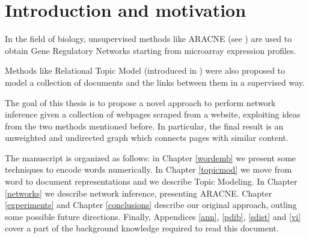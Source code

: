 \chapter{Introduction and motivation}

In the field of biology, unsupervised methods like ARACNE (see \cite{DBLP:journals/bmcbi/MargolinNBWSFC06}) 
are used to obtain Gene Regulatory Networks starting from microarray expression profiles. 

Methods like Relational Topic Model (introduced in \cite{pmlr-v5-chang09a}) were also proposed to 
model a collection of documents and the links between them in a supervised way. 

The goal of this thesis is to propose a novel approach to perform network inference given a collection of 
webpages scraped from a website, exploiting ideas from the two methods mentioned before. 
In particular, the final result is an unweighted and undirected graph which connects pages with similar content.

The manuscript is organized as follows: 
in Chapter \ref{wordemb} we present some techniques to encode words numerically. 
In Chapter \ref{topicmod} we move from word to document representations and we describe Topic Modeling. 
In Chapter \ref{networks} we describe network inference, presenting ARACNE.
Chapter \ref{experiments} and Chapter \ref{conclusions} describe our original approach,
outling some possible future directions. 
Finally, Appendices \ref{ann}, \ref{pdib}, \ref{sdist} and \ref{vi} cover a part of the background knowledge required to read this document.